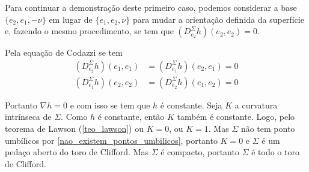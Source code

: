 \begin{demonstracao}
	Para continuar a demonstração deste primeiro caso, podemos considerar a base $\{ e_2, e_1, -\nu \}$ em lugar de $\{ e_1, e_2, \nu \}$ para mudar a orientação definida da superfície e, fazendo o mesmo procedimento, se tem que $(D_{e_2}^{\Sigma} h) (e_2,e_2)=0$.
	
	Pela equação de Codazzi se tem
	\begin{align*}
		(D_{e_2}^{\Sigma} h) (e_1,e_1) &= (D_{e_1}^{\Sigma} h) (e_2,e_1) = 0\\
		(D_{e_1}^{\Sigma} h) (e_2,e_2) &= (D_{e_2}^{\Sigma} h) (e_1,e_2) = 0
	\end{align*}
	
	Portanto $\nabla h = 0$ e com isso se tem que $h$ é constante. Seja $K$ a curvatura intrínseca de $\Sigma$. Como $h$ é constante, então $K$ também é constante. Logo, pelo teorema de Lawson (\ref{teo_lawson}) ou $K=0$, ou $K=1$. Mas $\Sigma$ não tem ponto umbílicos por \ref{nao_existem_pontos_umbilicos}, portanto $K=0$ e $\Sigma$ é um pedaço aberto do toro de Clifford. Mas $\Sigma$ é compacto, portanto $\Sigma$ é todo o toro de Clifford.
\end{demonstracao}